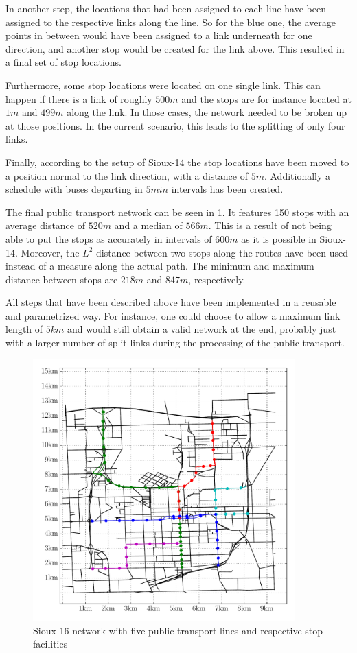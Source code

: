 In another step, the locations that had been assigned to each line have been
assigned to the respective links along the line. So for the blue one, the average
points in between would have been assigned to a link underneath for one direction,
and another stop would be created for the link above. This resulted in a final
set of stop locations.

Furthermore, some stop locations were located on one single link. This
can happen if there is a link of roughly $500m$ and the stops are for instance
located at $1m$ and $499m$ along the link. In those cases, the network needed to
be broken up at those positions. In the current scenario, this leads to the splitting
of only four links.

Finally, according to the setup of Sioux-14 the stop locations have been moved
to a position normal to the link direction, with a distance of $5m$. Additionally
a schedule with buses departing in $5min$ intervals has been created.

The final public transport network can be seen in \cref{fig:pt_network}. It features
150 stops with an average distance of $520m$ and a median of $566m$. This is a
result of not being able to put the stops as accurately in intervals of $600m$
as it is possible in Sioux-14. Moreover, the $L^2$ distance between two stops along
the routes have been used instead of a measure along the actual path. The minimum
and maximum distance between stops are $218m$ and $847m$, respectively.

All steps that have been described above have been implemented in a reusable and
parametrized way. For instance, one could choose to allow a maximum link length of
$5km$ and would still obtain a valid network at the end, probably just with a larger
number of split links during the processing of the public transport.

\begin{figure}
    \centering
    \includegraphics[width=0.9\textwidth]{figures/pt_network.pdf}
    \caption{Sioux-16 network with five public transport lines and respective stop
    facilities}
    \label{fig:pt_network}
\end{figure}

